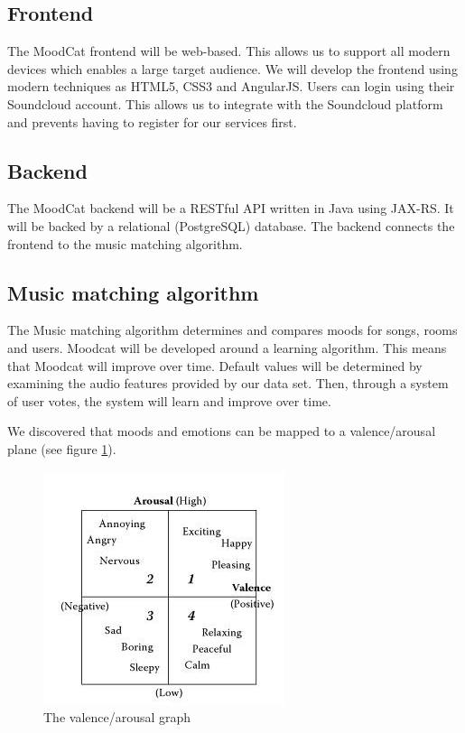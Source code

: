 \newpage

\subsection{Frontend}

The MoodCat frontend will be web-based.
This allows us to support all modern devices which enables a large target audience.
We will develop the frontend using modern techniques as HTML5\cite{HTML}, CSS3\cite{CSS} and AngularJS\cite{AngularJS}.
Users can login using their Soundcloud account.
This allows us to integrate with the Soundcloud platform and prevents having to register for our services first.

\subsection{Backend}

The MoodCat backend will be a RESTful\cite{rest} API written in Java using JAX-RS. It will be backed by a relational (PostgreSQL) database. The backend connects the frontend to the music matching algorithm.

\subsection{Music matching algorithm}

The Music matching algorithm determines and compares moods for songs, rooms and users.
Moodcat will be developed around a learning algorithm.
This means that Moodcat will improve over time.
Default values will be determined by examining the audio features provided by our data set.
Then, through a system of user votes, the system will learn and improve over time.

We discovered that moods and emotions can be mapped to a valence/arousal plane\cite{Yang:2006:MEC:1180639.1180665} (see figure \ref{fig:avgraph}).

\begin{figure}[h]
\center
\includegraphics[scale=0.75]{avgraph.jpg}
\caption{The valence/arousal graph \cite{Book}}
\endcenter
\label{fig:avgraph}

\end{figure}

